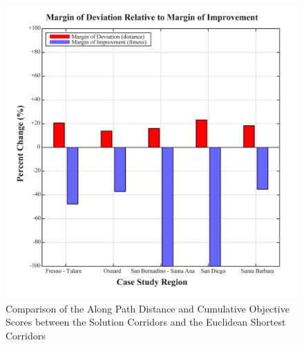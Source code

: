     \begin{figure}[!h]
        \begin{center}
        \includegraphics[width=5.5in]{figures/Margin_Improvement.png}
        \caption{Comparison of the Along Path Distance and Cumulative Objective Scores between the Solution Corridors and the Euclidean Shortest Corridors}
        \label{fig:MarginImprovement}
        \end{center}
    \end{figure}
